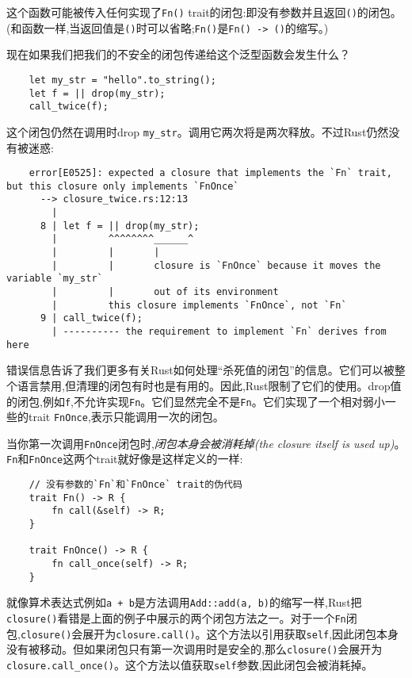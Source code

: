 这个函数可能被传入任何实现了\texttt{Fn()} trait的闭包:即没有参数并且返回\texttt{()}的闭包。(和函数一样,当返回值是\texttt{()}时可以省略;\texttt{Fn()}是\texttt{Fn() -> ()}的缩写。)

现在如果我们把我们的不安全的闭包传递给这个泛型函数会发生什么？
\begin{verbatim}
    let my_str = "hello".to_string();
    let f = || drop(my_str);
    call_twice(f);
\end{verbatim}

这个闭包仍然在调用时drop \texttt{my\_str}。调用它两次将是两次释放。不过Rust仍然没有被迷惑:
\begin{verbatim}
    error[E0525]: expected a closure that implements the `Fn` trait, but this closure only implements `FnOnce`
      --> closure_twice.rs:12:13
        |
      8 | let f = || drop(my_str);
        |         ^^^^^^^^______^
        |         |       |
        |         |       closure is `FnOnce` because it moves the variable `my_str`
        |         |       out of its environment
        |         this closure implements `FnOnce`, not `Fn`
      9 | call_twice(f);
        | ---------- the requirement to implement `Fn` derives from here
\end{verbatim}

错误信息告诉了我们更多有关Rust如何处理“杀死值的闭包”的信息。它们可以被整个语言禁用,但清理的闭包有时也是有用的。因此,Rust限制了它们的使用。drop值的闭包,例如\texttt{f},不允许实现\texttt{Fn}。它们显然完全不是\texttt{Fn}。它们实现了一个相对弱小一些的trait \texttt{FnOnce},表示只能调用一次的闭包。

当你第一次调用\texttt{FnOnce}闭包时,\emph{闭包本身会被消耗掉(the closure itself is used up)}。\texttt{Fn}和\texttt{FnOnce}这两个trait就好像是这样定义的一样:
\begin{verbatim}
    // 没有参数的`Fn`和`FnOnce` trait的伪代码
    trait Fn() -> R {
        fn call(&self) -> R;
    }

    trait FnOnce() -> R {
        fn call_once(self) -> R;
    }
\end{verbatim}

就像算术表达式例如\texttt{a + b}是方法调用\texttt{Add::add(a, b)}的缩写一样,Rust把\texttt{closure()}看错是上面的例子中展示的两个闭包方法之一。对于一个\texttt{Fn}闭包,\texttt{closure()}会展开为\texttt{closure.call()}。这个方法以引用获取\texttt{self},因此闭包本身没有被移动。但如果闭包只有第一次调用时是安全的,那么\texttt{closure()}会展开为\texttt{closure.call\_once()}。这个方法以值获取\texttt{self}参数,因此闭包会被消耗掉。

